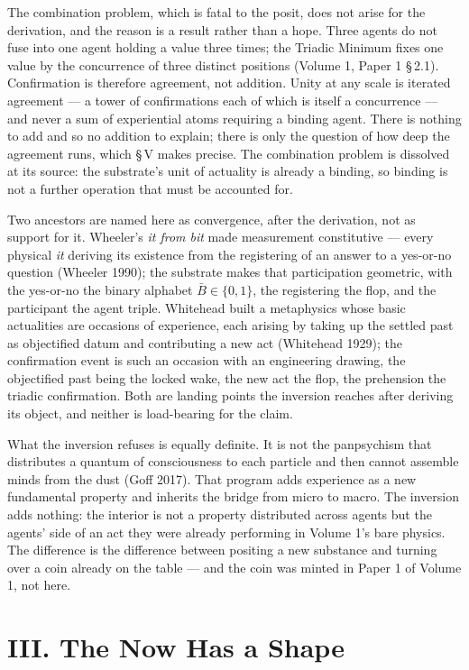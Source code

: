 \documentclass[11pt,oneside]{report}
\theoremstyle{definition}
\theoremstyle{remark}
\begin{document}
The combination problem, which is fatal to the posit, does not arise for
the derivation, and the reason is a result rather than a hope. Three
agents do not fuse into one agent holding a value three times; the
Triadic Minimum fixes one value by the concurrence of three distinct
positions (Volume 1, Paper 1 \S\,2.1). Confirmation is therefore
agreement, not addition. Unity at any scale is iterated agreement --- a
tower of confirmations each of which is itself a concurrence --- and
never a sum of experiential atoms requiring a binding agent. There is
nothing to add and so no addition to explain; there is only the question
of how deep the agreement runs, which \S\,V makes precise. The
combination problem is dissolved at its source: the substrate's unit of
actuality is already a binding, so binding is not a further operation
that must be accounted for.

Two ancestors are named here as convergence, after the derivation, not as
support for it. Wheeler's \emph{it from bit} made measurement
constitutive --- every physical \emph{it} deriving its existence from the
registering of an answer to a yes-or-no question (Wheeler 1990); the
substrate makes that participation geometric, with the yes-or-no the
binary alphabet \ensuremath{\bar{B} \in \{0,1\}}, the registering the
flop, and the participant the agent triple. Whitehead built a metaphysics
whose basic actualities are occasions of experience, each arising by
taking up the settled past as objectified datum and contributing a new
act (Whitehead 1929); the confirmation event is such an occasion with an
engineering drawing, the objectified past being the locked wake, the new
act the flop, the prehension the triadic confirmation. Both are landing
points the inversion reaches after deriving its object, and neither is
load-bearing for the claim.

What the inversion refuses is equally definite. It is not the panpsychism
that distributes a quantum of consciousness to each particle and then
cannot assemble minds from the dust (Goff 2017). That program adds
experience as a new fundamental property and inherits the bridge from
micro to macro. The inversion adds nothing: the interior is not a
property distributed across agents but the agents' side of an act they
were already performing in Volume 1's bare physics. The difference is the
difference between positing a new substance and turning over a coin
already on the table --- and the coin was minted in Paper 1 of Volume 1,
not here.

\section*{III. The Now Has a Shape}
\end{document}
